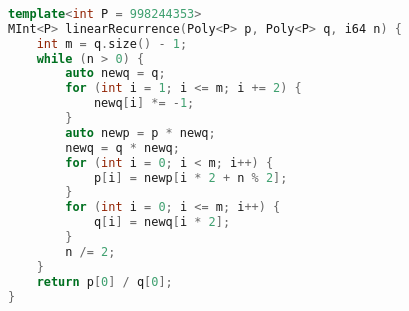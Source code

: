\begin{lstlisting}[language=c++]
 
template<int P = 998244353>
MInt<P> linearRecurrence(Poly<P> p, Poly<P> q, i64 n) {
    int m = q.size() - 1;
    while (n > 0) {
        auto newq = q;
        for (int i = 1; i <= m; i += 2) {
            newq[i] *= -1;
        }
        auto newp = p * newq;
        newq = q * newq;
        for (int i = 0; i < m; i++) {
            p[i] = newp[i * 2 + n % 2];
        }
        for (int i = 0; i <= m; i++) {
            q[i] = newq[i * 2];
        }
        n /= 2;
    }
    return p[0] / q[0];
} 
\end{lstlisting}